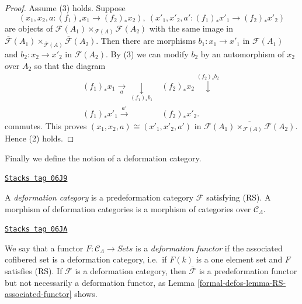 \begin{proof}
\medskip\noindent
Assume (3) holds. Suppose
$$
(x_1, x_2, a : (f_1)_*x_1 \to (f_2)_*x_2),
\ (x'_1, x'_2, a' : (f_1)_*x'_1 \to (f_2)_*x'_2)
$$
are objects of
$\mathcal{F}(A_1) \times_{\mathcal{F}(A)} \mathcal{F}(A_2)$
with the same image in
$\overline{\mathcal{F}}(A_1) \times_{\overline{\mathcal{F}}(A)}
\overline{\mathcal{F}}(A_2)$. Then there are morphisms $b_1: x_1 \to
x'_1$ in $\mathcal{F}(A_1)$ and $b_2: x_2 \to x'_2$ in $\mathcal
F(A_2)$. By (3) we can modify $b_2$ by an automorphism of $x_2$ over $A_2$ so
that the diagram
$$
\begin{array}{cc}(f_1)_*x_1 \underset{a}{\longrightarrow}\underset{(f_1)_*b_1}{\downarrow} & (f_2)_*x_2 \overset{(f_2)_*b_2}{\downarrow} \\ (f_1)_*x'_1 \overset{a'}{\longrightarrow} & (f_2)_*x'_2.\end{array}
$$
commutes. This proves $(x_1, x_2, a) \cong (x'_1, x'_2, a')$ in
$\overline{\mathcal{F}(A_1) \times_{\mathcal{F}(A)} \mathcal{F}(A_2)}$.
Hence (2) holds.
\end{proof}

Finally we define the notion of a deformation category.

\begin{definition}
\label{formal-defos-definition-deformation-category}
\href{https://stacks.math.columbia.edu/tag/06J9}{\texttt{Stacks tag 06J9}}

A {\it deformation category} is a predeformation category $\mathcal{F}$
satisfying (RS). A morphism of deformation categories is a morphism of
categories over $\mathcal{C}_\Lambda$.
\end{definition}

\begin{remark}
\label{formal-defos-remark-deformation-functor}
\href{https://stacks.math.columbia.edu/tag/06JA}{\texttt{Stacks tag 06JA}}

We say that a functor $F: \mathcal{C}_\Lambda \to \textit{Sets}$
is a {\it deformation functor} if the associated cofibered set is a
deformation category, i.e.\ if $F(k)$ is a one element set and $F$ satisfies
(RS). If $\mathcal{F}$ is a deformation category, then
$\overline{\mathcal{F}}$
is a predeformation functor but not necessarily a deformation functor, as
Lemma \ref{formal-defos-lemma-RS-associated-functor} shows.
\end{remark}

